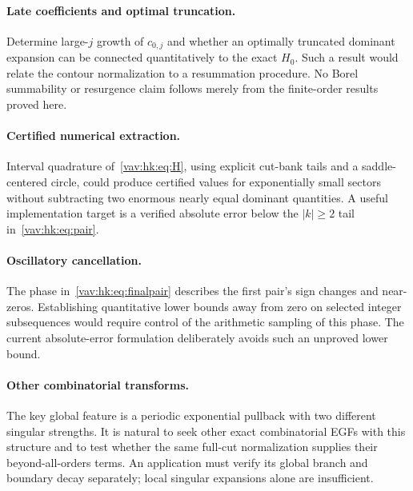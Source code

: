 \documentclass[11pt]{article}
\theoremstyle{remark}\newtheorem{remark}[theorem]{Remark}
\begin{document}
\paragraph{Late coefficients and optimal truncation.}
Determine large-$j$ growth of $c_{0,j}$ and whether an optimally truncated dominant expansion can be connected quantitatively to the exact $H_0$. Such a result would relate the contour normalization to a resummation procedure. No Borel summability or resurgence claim follows merely from the finite-order results proved here.

\paragraph{Certified numerical extraction.}
Interval quadrature of~\eqref{vav:hk:eq:H}, using explicit cut-bank tails and a saddle-centered circle, could produce certified values for exponentially small sectors without subtracting two enormous nearly equal dominant quantities. A useful implementation target is a verified absolute error below the $|k|\geq2$ tail in~\eqref{vav:hk:eq:pair}.

\paragraph{Oscillatory cancellation.}
The phase in~\eqref{vav:hk:eq:finalpair} describes the first pair's sign changes and near-zeros. Establishing quantitative lower bounds away from zero on selected integer subsequences would require control of the arithmetic sampling of this phase. The current absolute-error formulation deliberately avoids such an unproved lower bound.

\paragraph{Other combinatorial transforms.}
The key global feature is a periodic exponential pullback with two different singular strengths. It is natural to seek other exact combinatorial EGFs with this structure and to test whether the same full-cut normalization supplies their beyond-all-orders terms. An application must verify its global branch and boundary decay separately; local singular expansions alone are insufficient.
\end{document}
